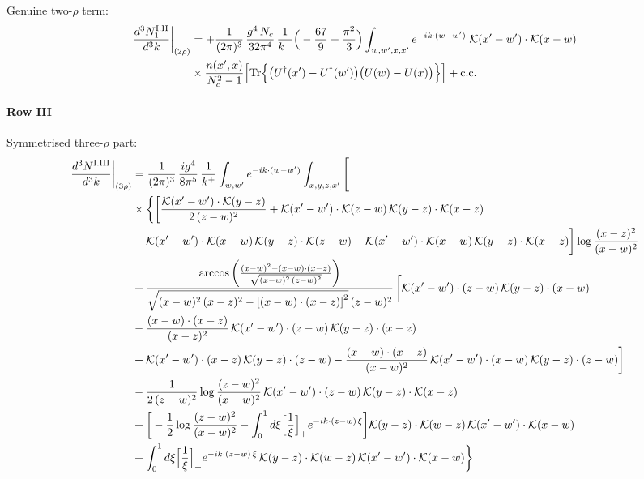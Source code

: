 \documentclass[9pt]{article}
\numberwithin{equation}{section}
\begin{document}
Genuine two-$\rho$ term:
\begin{align}
\frac{d^{3}N^{\rm I.II}_{1}}{d^{3}k}\bigg|_{(2\rho)} & = +\frac{1}{(2\pi)^{3}}\,\frac{g^{4}\,N_{c}}{32\pi^{4}}\,\frac{1}{k^{+}}\Big(-\frac{67}{9}+\frac{\pi^{2}}{3}\Big)\int_{w,w',x,x'} e^{-ik\cdot(w-w')}\;\mathcal{K}(x'-w')\cdot\mathcal{K}(x-w)\notag \\
& \times\frac{n(x',x)}{N_{c}^{2}-1}\Big[{\rm Tr}\Big\{\big(U^{\dagger}(x')-U^{\dagger}(w')\big)\big(U(w)-U(x)\big)\Big\}\Big]+{\rm c.c.}\label{eq:S-I.II-2o}
\end{align}
\paragraph*{Row III}
Symmetrised three-$\rho$ part:
\begin{align}
\frac{d^{3}N^{\rm I.III}}{d^{3}k}\bigg|_{(3\rho)}&=\frac{1}{(2\pi)^{3}}\,\frac{ig^{4}}{8\pi^{5}}\,\frac{1}{k^{+}}\int_{w,w'}e^{-ik\cdot(w-w')}\int_{x,y,z,x'}\Bigg[\notag\\
&\times\bigg\{\bigg[\frac{\mathcal{K}(x'-w')\cdot\mathcal{K}(y-z)}{2\,(z-w)^{2}}+\mathcal{K}(x'-w')\cdot\mathcal{K}(z-w)\,\mathcal{K}(y-z)\cdot\mathcal{K}(x-z)\notag\\
&-\mathcal{K}(x'-w')\cdot\mathcal{K}(x-w)\,\mathcal{K}(y-z)\cdot\mathcal{K}(z-w)-\mathcal{K}(x'-w')\cdot\mathcal{K}(x-w)\,\mathcal{K}(y-z)\cdot\mathcal{K}(x-z)\bigg]\log\frac{(x-z)^{2}}{(x-w)^{2}}\notag\\
&+\frac{\arccos\left(\frac{(x-w)^{2}-(x-w)\cdot (x-z)}{\sqrt{(x-w)^{2}\,(z-w)^{2}}}\right)}{\sqrt{(x-w)^{2}\,(x-z)^{2}-\left[(x-w)\cdot (x-z)\right]^{2}}\,(z-w)^{2}}\,\bigg[\mathcal{K}(x'-w')\cdot(z-w)\,\mathcal{K}(y-z)\cdot(x-w)\notag\\
&-\frac{(x-w)\cdot(x-z)}{(x-z)^{2}}\,\mathcal{K}(x'-w')\cdot(z-w)\,\mathcal{K}(y-z)\cdot(x-z)\notag\\
&+\mathcal{K}(x'-w')\cdot(x-z)\,\mathcal{K}(y-z)\cdot(z-w)-\frac{(x-w)\cdot(x-z)}{(x-w)^{2}}\,\mathcal{K}(x'-w')\cdot(x-w)\,\mathcal{K}(y-z)\cdot(z-w)\bigg]\notag\\
&-\frac{1}{2\,(z-w)^{2}}\log\frac{(z-w)^{2}}{(x-w)^{2}}\,\mathcal{K}(x'-w')\cdot(z-w)\,\mathcal{K}(y-z)\cdot\mathcal{K}(x-z)\notag\\
&+\bigg[-\frac{1}{2}\log\frac{(z-w)^{2}}{(x-w)^{2}}-\int_{0}^{1}d\xi\Big[\frac{1}{\xi}\Big]_{+}e^{-ik\cdot(z-w)\,\xi}\bigg]\mathcal{K}(y-z)\cdot\mathcal{K}(w-z)\,\mathcal{K}(x'-w')\cdot\mathcal{K}(x-w)\notag\\
&+\int_{0}^{1}d\xi\Big[\frac{1}{\xi}\Big]_{+}e^{-ik\cdot(z-w)\,\xi}\,\mathcal{K}(y-z)\cdot\mathcal{K}(w-z)\,\mathcal{K}(x'-w')\cdot\mathcal{K}(x-w)\bigg\}\notag\\

\end{align}
\end{document}
